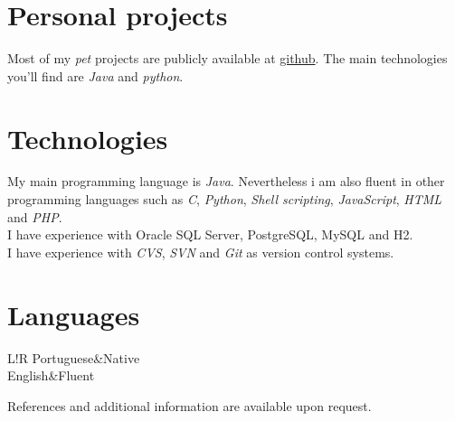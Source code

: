 \documentclass[10pt]{article}
\newcommand\VRule{\color{lightgray}\vrule width 0.5pt}
\begin{document}
\section*{Personal projects}
Most of my \emph{pet} projects are publicly available at \href{https://github.com/davidafsilva}{github}.
The main technologies you'll find are \emph{Java} and \emph{python}.

\section*{Technologies}
My main programming language is \emph{Java}. Nevertheless i am also fluent in other programming languages such as \emph{C}, \emph{Python}, \emph{Shell scripting}, \emph{JavaScript}, \emph{HTML} and \emph{PHP}.\\
I have experience with Oracle SQL Server, PostgreSQL, MySQL and H2.\\
I have experience with \emph{CVS}, \emph{SVN} and \emph{Git} as version control systems.

\section*{Languages}
\begin{tabular}{L!{\VRule}R}
Portuguese&Native\\
English&Fluent\\
\end{tabular}
{\vspace{20pt}\newline\newline
\vspace{20pt}
\scriptsize\hfill References and additional information are available upon request.}
\end{document}
